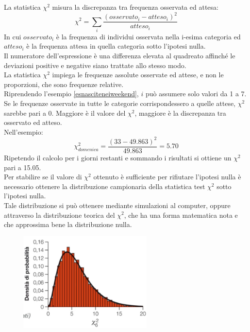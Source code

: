 \documentclass[10pt, draft]{book}
\begin{document}
La statistica $\chi^2$ misura la discrepanza tra frequenza osservata ed attesa:
\begin{equation}
\chi^2 = \sum_i \frac{(osservato_i - atteso_i)^2}{atteso_i}
\end{equation}
In cui $osservato_i$ è la frequenza di individui osservata nella i-esima categoria ed $atteso_i$ è la frequenza attesa in quella categoria sotto l'ipotesi nulla.
\\
Il numeratore dell'espressione è una differenza elevata al quadreato affinché le deviazioni positive e negative siano trattate allo stesso modo.
\\
La statistica $\chi^2$ impiega le frequenze assolute osservate ed attese, e non le proporzioni, che sono frequenze relative.
\\
Riprendendo l'esempio \ref{esnasciteneiweekend}, $i$ può assumere solo valori da 1 a 7. Se le frequenze osservate in tutte le categorie corrispondessero a quelle attese, $\chi^2$ sarebbe pari a 0. Maggiore è il valore del $\chi^2$, maggiore è la discrepanza tra osservato ed atteso.
\\
Nell'esempio:
\begin{equation}
\chi^2_{domenica} = \frac{(33 - 49.863)^2}{49.863} = 5.70
\end{equation}
Ripetendo il calcolo per i giorni restanti e sommando i risultati si ottiene un $\chi^2$ pari a 15.05.
\\
Per stabilire se il valore di $\chi^2$ ottenuto è sufficiente per rifiutare l'ipotesi nulla è necessario ottenere la distribuzione campionaria della statistica test $\chi^2$ sotto l'ipotesi nulla.
\\
Tale distribuzione si può ottenere mediante simulazioni al computer, oppure attraverso la distribuzione teorica del $\chi^2$, che ha una forma matematica nota e che approssima bene la distribuzione nulla.
    \begin{figure}[h]\label{fig8.2-1}
    \centering
    \includegraphics[width=0.6\textwidth]{fig8.2-1}
    \caption{\small{}}
    \end{figure}
\end{document}
